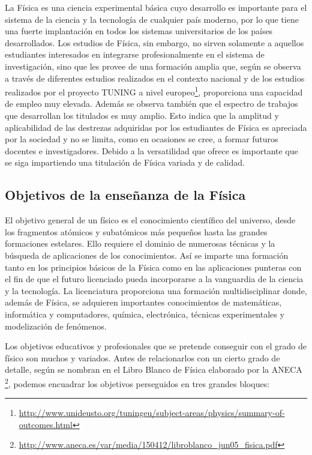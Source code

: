 La Física es una ciencia experimental básica cuyo desarrollo es importante para el sistema de la ciencia y la tecnología de cualquier país moderno, por lo que tiene una fuerte implantación en todos los sistemas universitarios de los países desarrollados. Los estudios de Física, sin embargo, no sirven solamente a aquellos estudiantes interesados en integrarse profesionalmente en el sistema de investigación, sino que les provee de una formación amplia que, según se observa a través de diferentes estudios realizados en el contexto nacional y de los estudios realizados por el proyecto TUNING a nivel europeo\footnote{\url{http://www.unideusto.org/tuningeu/subject-areas/physics/summary-of-outcomes.html}}, proporciona una capacidad de empleo muy elevada. Además se observa también que el espectro de trabajos que desarrollan los titulados es muy amplio. Esto indica que la amplitud y aplicabilidad de las destrezas adquiridas por los estudiantes de Física es apreciada por la sociedad y no se limita, como en ocasiones se cree, a formar futuros docentes e investigadores. Debido a la versatilidad que ofrece es importante que se siga impartiendo una titulación de Física variada y de calidad.

\subsection{Objetivos de la enseñanza de la Física} \label{sec:objetivos}

El objetivo general de un físico es el conocimiento científico del universo, desde los fragmentos atómicos y subatómicos más pequeños hasta las grandes formaciones estelares. Ello requiere el dominio de numerosas técnicas y la búsqueda de aplicaciones de los conocimientos. Así se imparte una formación tanto en los principios básicos de la Física como en las aplicaciones punteras con el fin de que el futuro licenciado pueda incorporarse a la vanguardia de la ciencia y la tecnología. La licenciatura proporciona una formación multidisciplinar donde, además de Física, se adquieren importantes conocimientos de matemáticas, informática y computadores, química, electrónica, técnicas experimentales y modelización de fenómenos.


Los objetivos educativos y profesionales que se pretende conseguir con el grado de físico son muchos y variados. Antes de relacionarlos con un cierto grado de detalle, según se nombran en el Libro Blanco de Física elaborado por la ANECA \footnote{\url{http://www.aneca.es/var/media/150412/libroblanco_jun05_fisica.pdf}}, podemos encuadrar los objetivos perseguidos en tres grandes bloques:

